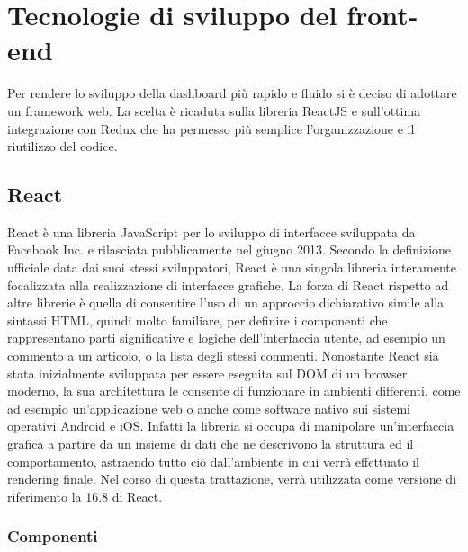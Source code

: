 \chapter{Tecnologie di sviluppo del front-end}
\label{chap:tecnologie di sviluppo del frontend}

Per rendere lo sviluppo della dashboard più rapido e fluido si è deciso di adottare un framework web. La scelta è ricaduta sulla libreria ReactJS e sull'ottima integrazione con Redux che ha permesso più semplice l'organizzazione e il riutilizzo del codice.

\section{React}
\label{sec:react}

React è una libreria JavaScript per lo sviluppo di interfacce sviluppata da Facebook Inc. e rilasciata pubblicamente nel giugno 2013.
Secondo la definizione ufficiale data dai suoi stessi sviluppatori, React è una singola libreria interamente focalizzata alla realizzazione di interfacce grafiche. La forza di React rispetto ad altre librerie è quella di consentire l’uso di un approccio dichiarativo simile alla sintassi HTML, quindi molto familiare, per definire i componenti che rappresentano parti significative e logiche dell’interfaccia utente, ad esempio un commento a un articolo, o la lista degli stessi commenti.
Nonostante React sia stata inizialmente sviluppata per essere eseguita sul DOM di un browser moderno, la sua architettura le consente di funzionare in ambienti differenti,
come ad esempio un'applicazione web o anche come software nativo sui sistemi operativi Android e iOS. Infatti la libreria si occupa di manipolare un'interfaccia grafica a partire da
un insieme di dati che ne descrivono la struttura ed il comportamento, astraendo tutto ciò
dall’ambiente in cui verrà effettuato il rendering finale.
Nel corso di questa trattazione, verrà utilizzata come versione di riferimento la 16.8 di
React.

\subsection{Componenti}
\label{sec:componenti}

